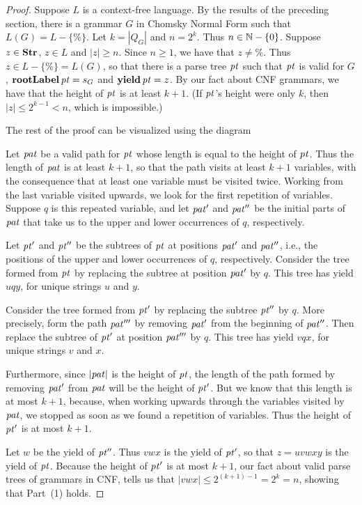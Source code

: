 \begin{proof}
Suppose $L$ is a context-free language.  By the results of the
preceding section, there is a grammar $G$ in Chomsky Normal Form such
that $L(G)=L-\{\%\}$.  Let $k=|Q_G|$ and $n= 2^k$.  Thus
$n\in\mathbb{N}-\{0\}$. Suppose $z\in \mathbf{Str}$, $z\in L$ and $|z|\geq n$.
Since $n\geq 1$, we have that $z\neq\%$.  Thus $z\in L-\{\%\}=L(G)$,
so that there is a parse tree ${\it pt}$ such that ${\it pt}$ is valid for $G$,
$\mathbf{rootLabel}\,{\it pt}=s_G$ and $\mathbf{yield}\,{\it pt}=z$.  By our fact about CNF
grammars, we have that the height of ${\it pt}$ is at least $k+1$.  (If
${\it pt}$'s height were only $k$, then $|z|\leq 2^{k-1}<n$, which is
impossible.)

The rest of the proof can be visualized using the
diagram
\begin{center}

\end{center}

Let ${\it pat}$ be a valid path for ${\it pt}$ whose length is equal to the
height of ${\it pt}$.  Thus the length of ${\it pat}$ is at least $k+1$, so that
the path visits at least $k+1$ variables, with the consequence that at
least one variable must be visited twice.  Working from the last
variable visited upwards, we look for the first repetition of
variables.  Suppose $q$ is this repeated variable, and let ${\it pat}'$
and ${\it pat}''$ be the initial parts of ${\it pat}$ that take us
to the upper and lower occurrences of $q$, respectively.

Let ${\it pt}'$ and ${\it pt}''$ be the subtrees of ${\it pt}$ at positions
${\it pat}'$ and ${\it pat}''$, i.e., the positions of the upper and lower
occurrences of $q$, respectively.
Consider the tree formed from ${\it pt}$ by replacing the subtree
at position ${\it pat}'$ by $q$.  This tree has yield
$uqy$, for unique strings $u$ and $y$.

Consider the tree formed from ${\it pt}'$ by replacing the subtree
${\it pt}''$ by $q$.  More precisely, form the path ${\it pat}'''$ 
by removing ${\it pat}'$ from the beginning of ${\it pat}''$.
Then replace the subtree of ${\it pt}'$ at position ${\it pat}'''$ by
$q$.  This tree has yield $vqx$, for unique strings $v$ and $x$.

Furthermore, since $|{\it pat}|$ is the height of ${\it pt}$, the
length of the path formed by removing ${\it pat}'$ from ${\it pat}$ will be the
height of ${\it pt}'$.  But we know that this length is at most $k+1$,
because, when working upwards through the variables visited by ${\it pat}$,
we stopped as soon as we found a repetition of variables.  Thus the
height of ${\it pt}'$ is at most $k+1$.

Let $w$ be the yield of ${\it pt}''$.  Thus $vwx$ is the yield of ${\it pt}'$,
so that $z=uvwxy$ is the yield of ${\it pt}$.  Because the height of ${\it pt}'$
is at most $k+1$, our fact about valid parse trees of grammars in CNF,
tells us that $|vwx|\leq 2^{(k+1)-1} = 2^k=n$, showing that Part~(1)
holds.


\end{proof}
